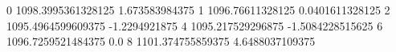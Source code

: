 0 1098.3995361328125 1.673583984375
1 1096.76611328125 0.0401611328125
2 1095.4964599609375 -1.2294921875
4 1095.217529296875 -1.5084228515625
6 1096.7259521484375 0.0
8 1101.374755859375 4.6488037109375

